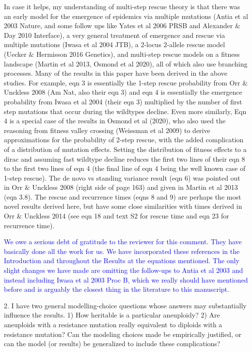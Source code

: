 \documentclass[12pt]{extarticle}
\begin{document}
In case it helps, my understanding of multi-step rescue theory is that there was an early model for the emergence of epidemics via multiple mutations (Antia et al 2003 Nature, and some follow ups like Yates et al 2006 PRSB and Alexander $\&$ Day 2010 Interface), a very general treatment of emergence and rescue via multiple mutations (Iwasa et al 2004 JTB), a 2-locus 2-allele rescue model (Uecker $\&$ Hermisson 2016 Genetics), and multi-step rescue models on a fitness landscape (Martin et al 2013, Osmond et al 2020), all of which also use branching processes. Many of the results in this paper have been derived in the above studies. For example, eqn 3 is essentially the 1-step rescue probability from Orr $\&$ Unckless 2008 (Am Nat, also their eqn 3) and eqn 4 is essentially the emergence probability from Iwasa et al 2004 (their eqn 3) multiplied by the number of first step mutations that occur during the wildtypes decline. Even more similarly, Eqn 4 is a special case of the results in Osmond et al (2020), who also used the reasoning from fitness valley crossing (Weissman et al 2009) to derive approximations for the probability of 2-step rescue, with the added complication of a distribution of mutation effects. Setting the distribution of fitness effects to a dirac and assuming fast wildtype decline reduces the first two lines of their eqn 8 to the first two lines of eqn 4 (the final line of eqn 4 being the well known case of 1-step rescue). The de novo vs standing variance result (eqn 6) was pointed out in Orr $\&$ Unckless 2008 (right side of page 163) and given in Martin et al 2013 (eqn 3.8). The rescue and recurrence times (eqns 8 and 9) are perhaps the most novel results derived here, but have some close similarities with times derived in Orr $\&$ Unckless 2014 (see eqn 18 and text S2 for rescue time and eqn 23 for recurrence time).

\textcolor{blue}{
We owe a serious debt of gratitude to the reviewer for this comment. They have basically done all the work for us. We have incorporated these references in the Introduction and throughout the Results at the equations mentioned. The only slight changes we have made are omitting the follow-ups to Antia et al 2003 and instead including Iwasa et al 2003 Proc B, which we really should have mentioned before and is arguably the closest thing in the literature to this manuscript.
} 

2. I have two general modelling-choice questions whose answers may substantially influence the results. 1) How heritable is a particular aneuploidy?  2) Are aneuploids with a resistance mutation really equivalent to diploids with a resistance mutation? Can the modeling choices made be empirically justified, or can the model (or results) be generalized to include these complications?
\end{document}
